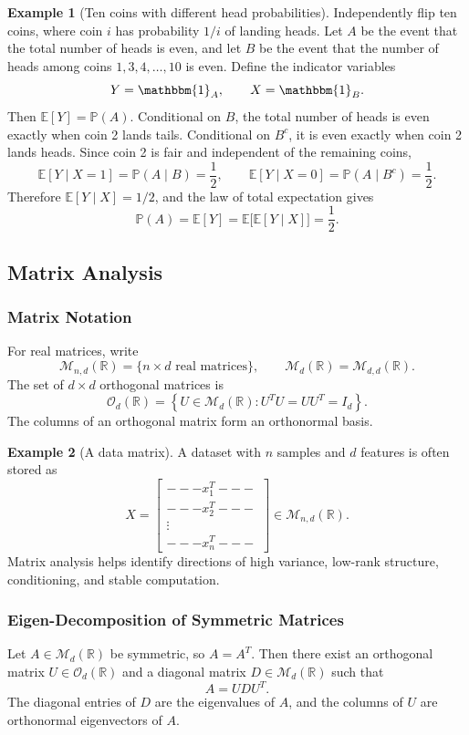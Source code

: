 \documentclass[12pt,oneside]{book}
\numberwithin{equation}{section}
\theoremstyle{definition}
\newtheorem{example}{Example}[section]
\theoremstyle{plain}
\theoremstyle{remark}
\newcommand{\R}{\mathbb{R}}
\newcommand{\E}{\mathbb{E}}
\newcommand{\ind}{\mathbbm{1}}
\begin{document}
\begin{example}[Ten coins with different head probabilities]
Independently flip ten coins, where coin $i$ has probability $1/i$ of landing heads. Let $A$ be the event that the total number of heads is even, and let $B$ be the event that the number of heads among coins $1,3,4,\ldots,10$ is even. Define the indicator variables
\[
Y=\ind_A,
\qquad
X=\ind_B.
\]
Then $\E[Y]=\mathbb{P}(A)$. Conditional on $B$, the total number of heads is even exactly when coin 2 lands tails. Conditional on $B^c$, it is even exactly when coin 2 lands heads. Since coin 2 is fair and independent of the remaining coins,
\[
\E[Y\mid X=1]=\mathbb{P}(A\mid B)=\frac{1}{2},
\qquad
\E[Y\mid X=0]=\mathbb{P}(A\mid B^c)=\frac{1}{2}.
\]
Therefore $\E[Y\mid X]=1/2$, and the law of total expectation gives
\[
\mathbb{P}(A)=\E[Y]
=\E\bigl[\E[Y\mid X]\bigr]
=\frac{1}{2}.
\]
\end{example}

\subsection{Matrix Analysis}

\subsubsection{Matrix Notation}
For real matrices, write
\[
\mathcal{M}_{n,d}(\R)
=\{n\times d\text{ real matrices}\},
\qquad
\mathcal{M}_d(\R)=\mathcal{M}_{d,d}(\R).
\]
The set of $d\times d$ orthogonal matrices is
\[
\mathcal{O}_d(\R)
=\left\{U\in\mathcal{M}_d(\R):
U^TU=UU^T=I_d\right\}.
\]
The columns of an orthogonal matrix form an orthonormal basis.

\begin{example}[A data matrix]
A dataset with $n$ samples and $d$ features is often stored as
\[
X=
\begin{bmatrix}
---x_1^T---\\
---x_2^T---\\
\vdots\\
---x_n^T---
\end{bmatrix}
\in\mathcal{M}_{n,d}(\R).
\]
Matrix analysis helps identify directions of high variance, low-rank structure, conditioning, and stable computation.
\end{example}

\subsubsection{Eigen-Decomposition of Symmetric Matrices}
Let $A\in\mathcal{M}_d(\R)$ be symmetric, so $A=A^T$. Then there exist an orthogonal matrix $U\in\mathcal{O}_d(\R)$ and a diagonal matrix $D\in\mathcal{M}_d(\R)$ such that
\[
A=UDU^T.
\]
The diagonal entries of $D$ are the eigenvalues of $A$, and the columns of $U$ are orthonormal eigenvectors of $A$.
\end{document}
